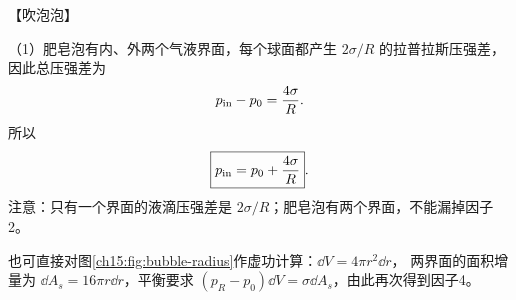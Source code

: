{\begin{origexamplebox}{【吹泡泡】}
\ThQBubble
\end{origexamplebox}\par\nopagebreak[4]

\par\nopagebreak[4]\begin{xesolution}
（1）肥皂泡有内、外两个气液界面，每个球面都产生 $2\sigma/R$ 的拉普拉斯压强差，因此总压强差为
\begin{equation*}
  p_{\rm in}-p_0=\frac{4\sigma}{R}.
\end{equation*}
所以
\begin{equation}
  \boxed{p_{\rm in}=p_0+\frac{4\sigma}{R}}.
\end{equation}
注意：只有一个界面的液滴压强差是 $2\sigma/R$；肥皂泡有两个界面，不能漏掉因子2。

\par\noindent\begin{minipage}{\linewidth}
\bubbleRevisionDiagram
{}\label{ch15:fig:bubble-radius}
\end{minipage}\par\medskip
也可直接对图\ref{ch15:fig:bubble-radius}作虚功计算：$\dd V=4\pi r^2\dd r$，
两界面的面积增量为 $\dd A_s=16\pi r\dd r$，平衡要求
$(p_R-p_0)\dd V=\sigma\dd A_s$，由此再次得到因子4。


\end{xesolution}}
